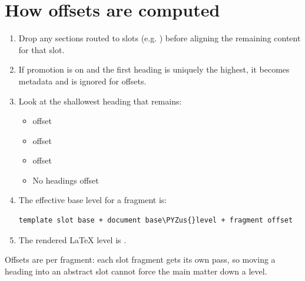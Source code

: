 \documentclass[a4paper,twoside]{article}
\begin{document}
\section{How offsets are computed}
\begin{enumerate}
\item Drop any sections routed to slots (e.g. ) before aligning the remaining content for that slot.
\item If promotion is on and the first heading is uniquely the highest, it becomes metadata and is ignored for offsets.
\item Look at the shallowest heading that remains:
\begin{itemize}
\item {} offset 
\item {} offset 
\item {} offset 
\item No headings offset 
\end{itemize}
\item The effective base level for a fragment is:
\begin{tscode}[lang=text, engine=pygments]
\begin{Verbatim}[commandchars=\\\{\},breaklines, breakanywhere, commandchars=\\\{\}]
template slot base + document base\PYZus{}level + fragment offset
\end{Verbatim}
\end{tscode}
\item The rendered \LaTeX{} level is .
\end{enumerate}
Offsets are per fragment: each slot fragment gets its own pass, so moving a heading into an abstract slot cannot force the main matter down a level.
\end{document}

